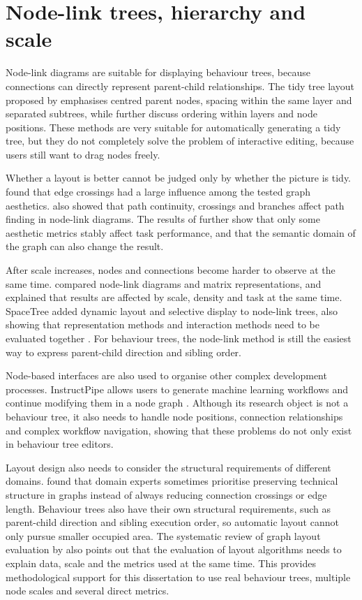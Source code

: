 \section{Node-link trees, hierarchy and scale}

Node-link diagrams are suitable for displaying behaviour trees, because connections can directly represent parent-child relationships. The tidy tree layout proposed by \textcite{reingold1981tidier} emphasises centred parent nodes, spacing within the same layer and separated subtrees, while \textcite{sugiyama1981methods} further discuss ordering within layers and node positions. These methods are very suitable for automatically generating a tidy tree, but they do not completely solve the problem of interactive editing, because users still want to drag nodes freely.

Whether a layout is better cannot be judged only by whether the picture is tidy. \textcite{purchase1997aesthetic} found that edge crossings had a large influence among the tested graph aesthetics. \textcite{ware2002cognitive} also showed that path continuity, crossings and branches affect path finding in node-link diagrams. The results of \textcite{purchase2002empirical} further show that only some aesthetic metrics stably affect task performance, and that the semantic domain of the graph can also change the result.

After scale increases, nodes and connections become harder to observe at the same time. \textcite{ghoniem2005readability} compared node-link diagrams and matrix representations, and explained that results are affected by scale, density and task at the same time. SpaceTree added dynamic layout and selective display to node-link trees, also showing that representation methods and interaction methods need to be evaluated together \parencite{plaisant2002spacetree}. For behaviour trees, the node-link method is still the easiest way to express parent-child direction and sibling order.

Node-based interfaces are also used to organise other complex development processes. InstructPipe allows users to generate machine learning workflows and continue modifying them in a node graph \parencite{zhou2025instructpipe}. Although its research object is not a behaviour tree, it also needs to handle node positions, connection relationships and complex workflow navigation, showing that these problems do not only exist in behaviour tree editors.

Layout design also needs to consider the structural requirements of different domains. \textcite{helmke2024domain} found that domain experts sometimes prioritise preserving technical structure in graphs instead of always reducing connection crossings or edge length. Behaviour trees also have their own structural requirements, such as parent-child direction and sibling execution order, so automatic layout cannot only pursue smaller occupied area. The systematic review of graph layout evaluation by \textcite{dibartolomeo2024evaluating} also points out that the evaluation of layout algorithms needs to explain data, scale and the metrics used at the same time. This provides methodological support for this dissertation to use real behaviour trees, multiple node scales and several direct metrics.

